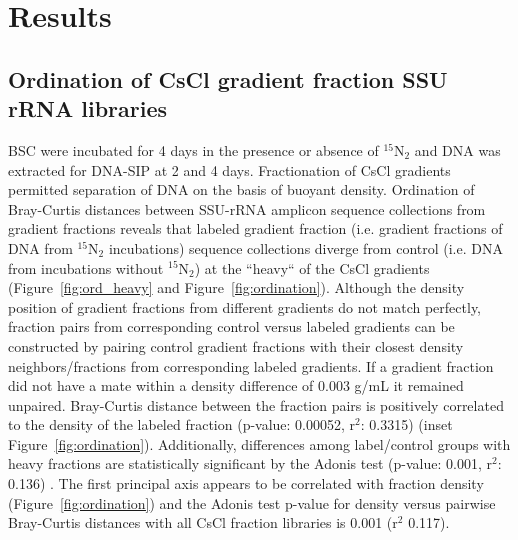 \section{Results}
\subsection{Ordination of CsCl gradient fraction SSU rRNA libraries} 
BSC were incubated for 4 days in the presence or absence of $^{15}$N$_{2}$ and
DNA was extracted for DNA-SIP at 2 and 4 days. Fractionation of CsCl gradients
permitted separation of DNA on the basis of buoyant density. Ordination of
Bray-Curtis \citep{Bray_1957} distances between SSU-rRNA amplicon sequence
collections from gradient fractions reveals that labeled gradient fraction
(i.e. gradient fractions of DNA from $^{15}$N$_{2}$ incubations) sequence
collections diverge from control (i.e. DNA from incubations without
$^{15}$N$_{2}$) at the ``heavy`` of the CsCl gradients
(Figure~\ref{fig:ord_heavy} and Figure~\ref{fig:ordination}). Although the density position of gradient
fractions from different gradients do not match perfectly, fraction pairs from
corresponding control versus labeled gradients can be constructed by pairing
control gradient fractions with their closest density neighbors/fractions from
corresponding labeled gradients.  If a gradient fraction did not have a mate
within a density difference of 0.003 g/mL it remained unpaired. Bray-Curtis
distance between the fraction pairs is positively correlated to the density of
the labeled fraction (p-value: 0.00052, r$^{2}$: 0.3315) (inset
Figure~\ref{fig:ordination}). Additionally, differences among label/control groups
with heavy fractions are statistically significant by the Adonis test (p-value:
0.001, r$^{2}$: 0.136) \citep{Anderson_2001}. The first principal axis appears
to be correlated with fraction density (Figure~\ref{fig:ordination}) and the
Adonis test p-value for density versus pairwise Bray-Curtis distances with all
CsCl fraction libraries is 0.001 (r$^{2}$ 0.117).

